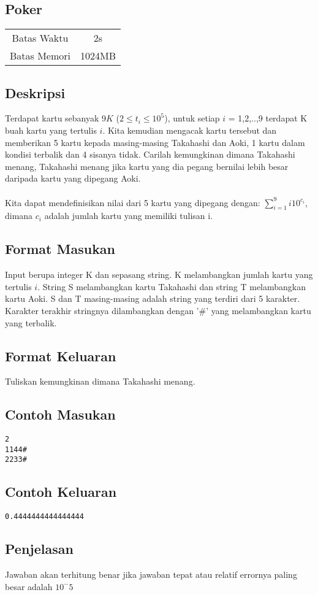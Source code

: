 \documentclass{article}
\begin{document}
\begin{center}

    
    \section*{Poker} %

    \begin{tabular}{ | c c | }
        \hline
        Batas Waktu  & 2s \\    %
        Batas Memori & 1024MB \\  %
        \hline
    \end{tabular}
\end{center}

\subsection*{Deskripsi}
Terdapat kartu sebanyak 9$K$ ($2 \leq t_i \leq 10^5$), untuk setiap $i$ = 1,2,..,9 terdapat K buah kartu yang tertulis $i$. Kita kemudian mengacak kartu tersebut dan memberikan 5 kartu kepada masing-masing Takahashi dan Aoki, 1 kartu dalam kondisi terbalik dan 4 sisanya tidak. Carilah kemungkinan dimana Takahashi menang, Takahashi menang jika kartu yang dia pegang bernilai lebih besar daripada kartu yang dipegang Aoki.
\\
\\
Kita dapat mendefinisikan nilai dari 5 kartu yang dipegang dengan:
$\displaystyle\sum_{i=1}^9i10^{c_i}$, dimana $c_i$ adalah jumlah kartu yang memiliki tulisan i.
\subsection*{Format Masukan}
Input berupa integer K dan sepasang string. K melambangkan jumlah kartu yang tertulis $i$. String S melambangkan kartu Takahashi dan string T melambangkan kartu Aoki. S dan T masing-masing adalah string yang terdiri dari 5 karakter. Karakter terakhir stringnya dilambangkan dengan '#' yang melambangkan kartu yang terbalik.

\subsection*{Format Keluaran}
Tuliskan kemungkinan dimana Takahashi menang.
\\

\begin{multicols}{2}
\subsection*{Contoh Masukan}
\begin{lstlisting}
2
1144#
2233#
\end{lstlisting}
\columnbreak
\subsection*{Contoh Keluaran}
\begin{lstlisting}
0.4444444444444444
\end{lstlisting}
\vfill
\null
\end{multicols}

\subsection*{Penjelasan}
Jawaban akan terhitung benar jika jawaban tepat atau relatif errornya paling besar adalah $10^-5$

\pagebreak
\end{document}
